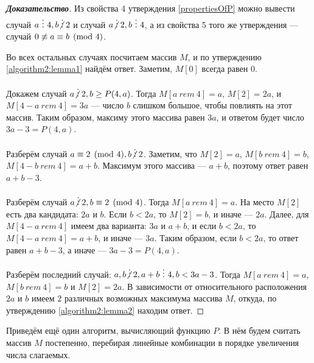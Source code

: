 \documentclass[12pt]{article}
\begin{document}
\begin{proof}[\textbf{Доказательство}]
Из свойства 4 утверждения \ref{propertiesOfP} можно вывести случай $a \ \vdots \ 4, b \centernot \vdots 2$ и случай $a \centernot \vdots 2, b \ \vdots \ 4$, а из свойства 5 того же утверждения --- случай $0 \centernot \equiv a \equiv b \pmod 4$.

Во всех остальных случаях посчитаем массив $M$, и по утверждению \ref{algorithm2:lemma1} найдём ответ. Заметим, $M[0]$ всегда равен $0$.

Докажем случай $a \centernot\vdots 2, b \ge P(4, a)$. Тогда $M[a \ rem \ 4] = a$, $M[2] = 2a$, и $M[4 - a \ rem \ 4] = 3a$ --- число $b$ слишком большое, чтобы повлиять на этот массив. Таким образом, максиму этого массива равен $3a$, и ответом будет число $3a - 3 = P(4, a)$.

Разберём случай $a \equiv 2 \pmod 4, b \centernot\vdots 2$. Заметим, что $M[2] = a$, $M[b \ rem \ 4] = b$, $M[4 - b \ rem \ 4] = a + b$. Максимум этого массива --- $a + b$, поэтому ответ равен $a + b - 3$.

Разберём случай $a \centernot\vdots 2, b \equiv 2 \pmod 4$. Тогда $M[a \ rem \ 4] = a$. На место $M[2]$ есть два кандидата: $2a$ и $b$. Если $b < 2a$, то $M[2] = b$, и иначе --- $2a$. Далее, для $M[4 - a \ rem \ 4]$ имеем два варианта: $3a$ и $a + b$, и если $b < 2a$, то $M[4 - a \ rem \ 4] = a + b$, и иначе --- $3a$. Таким образом, если $b < 2a$, то ответ равен $a + b - 3$, а иначе --- $3a - 3 = P(4, a)$.

Разберём последний случай: $a, b \centernot \vdots 2, a + b \ \vdots \ 4, b < 3a - 3$. Тогда $M[a \ rem \ 4] = a$, $M[b \ rem \ 4] = b$ и $M[2] = 2a$. В зависимости от относительного расположения $2a$ и $b$ имеем $2$ различных возможных максимума массива $M$, откуда, по утверждению \ref{algorithm2:lemma2} находим ответ.
\end{proof}

Приведём ещё один алгоритм, вычисляющий функцию $P$. В нём будем считать массив $M$ постепенно, перебирая линейные комбинации в порядке увеличения числа слагаемых.
\end{document}
